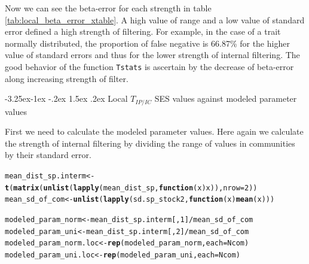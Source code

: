 \documentclass[12pt]{article}\usepackage[]{graphicx}\usepackage[]{color}
\makeatletter
\newcommand{\hlnum}[1]{\textcolor[rgb]{0.686,0.059,0.569}{#1}}%
\newcommand{\hlopt}[1]{\textcolor[rgb]{0,0,0}{#1}}%
\newcommand{\hlstd}[1]{\textcolor[rgb]{0.345,0.345,0.345}{#1}}%
\newcommand{\hlkwa}[1]{\textcolor[rgb]{0.161,0.373,0.58}{\textbf{#1}}}%
\newcommand{\hlkwb}[1]{\textcolor[rgb]{0.69,0.353,0.396}{#1}}%
\newcommand{\hlkwc}[1]{\textcolor[rgb]{0.333,0.667,0.333}{#1}}%
\newcommand{\hlkwd}[1]{\textcolor[rgb]{0.737,0.353,0.396}{\textbf{#1}}}%
\newenvironment{kframe}{%
 \def\at@end@of@kframe{}%
 \ifinner\ifhmode%
  \def\at@end@of@kframe{\end{minipage}}%
  \begin{minipage}{\columnwidth}%
 \fi\fi%
 \def\FrameCommand##1{\hskip\@totalleftmargin \hskip-\fboxsep
 \colorbox{shadecolor}{##1}\hskip-\fboxsep
     \hskip-\linewidth \hskip-\@totalleftmargin \hskip\columnwidth}%
 \MakeFramed {\advance\hsize-\width
   \@totalleftmargin\z@ \linewidth\hsize
   \@setminipage}}%
 {\par\unskip\endMakeFramed%
 \at@end@of@kframe}
\newenvironment{knitrout}{}{} %
\newcounter {subsubsubsection}[subsubsection]
\newcommand\subsubsubsection{\@startsection{subsubsubsection}{4}{\z@}%
          {-3.25ex\@plus -1ex \@minus -.2ex}%
          {1.5ex \@plus .2ex}%
          {\normalfont\normalsize\bfseries}}
\makeatother
\begin{document}
 

Now we can see the beta-error for each strength in table \ref{tab:local_beta_error_xtable}. A high value of range and a low value of standard error defined a high strength of filtering. For example, in the case of a trait normally distributed, the proportion of false negative is 66.87\% for the higher value of standard errors and thus for the lower strength of internal filtering. The good behavior of the function \texttt{Tstats} is ascertain by the decrease of beta-error along increasing strength of filter.
 
 
  \subsubsubsection {Local $T_{IP/IC}$ SES values against modeled parameter values}
  
  First we need to calculate the modeled parameter values. Here again we calculate the strength of internal filtering by dividing the range of values in communities by their standard error.
  
\begin{knitrout}\small
{}\color{fgcolor}\begin{kframe}
\begin{alltt}
\hlstd{mean_dist_sp.interm} \hlkwb{<-} \hlkwd{t}\hlstd{(}\hlkwd{matrix}\hlstd{(}\hlkwd{unlist}\hlstd{(}\hlkwd{lapply}\hlstd{(mean_dist_sp,} \hlkwa{function}\hlstd{(}\hlkwc{x}\hlstd{) x)),} \hlkwc{nrow} \hlstd{=} \hlnum{2}\hlstd{))}
\hlstd{mean_sd_of_com} \hlkwb{<-} \hlkwd{unlist}\hlstd{(}\hlkwd{lapply}\hlstd{(sd.sp_stock2,} \hlkwa{function}\hlstd{(}\hlkwc{x}\hlstd{)} \hlkwd{mean}\hlstd{(x)))}

\hlstd{modeled_param_norm} \hlkwb{<-} \hlstd{mean_dist_sp.interm[,} \hlnum{1}\hlstd{]} \hlopt{/} \hlstd{mean_sd_of_com}
\hlstd{modeled_param_uni} \hlkwb{<-} \hlstd{mean_dist_sp.interm[,} \hlnum{2}\hlstd{]} \hlopt{/} \hlstd{mean_sd_of_com}
\hlstd{modeled_param_norm.loc} \hlkwb{<-} \hlkwd{rep}\hlstd{(modeled_param_norm,} \hlkwc{each} \hlstd{= Ncom)}
\hlstd{modeled_param_uni.loc} \hlkwb{<-} \hlkwd{rep}\hlstd{(modeled_param_uni,} \hlkwc{each} \hlstd{= Ncom)}
\end{alltt}
\end{kframe}
\end{knitrout}
\end{document}
